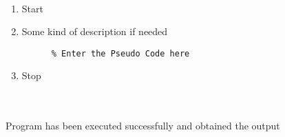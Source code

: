 \documentclass{article}
\begin{document}
\vspace{1cm}








  \\
\begin{enumerate}

    \item Start

    \item Some kind of description if needed
    \begin{verbatim}
      % Enter the Pseudo Code here
    \end{verbatim}

    \item Stop
    
\end{enumerate}








\vspace{1cm}
















 \\ \\
Program has been executed successfully and obtained the output
\end{document}

